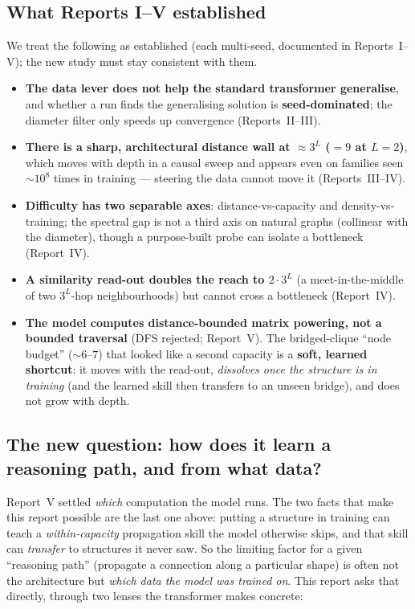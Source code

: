 \documentclass[11pt,a4paper]{article}
\begin{document}
\subsection{What Reports I--V established}
\label{sec:recap}

We treat the following as established (each multi-seed, documented in Reports~I--V); the new study
must stay consistent with them.

\begin{itemize}\setlength\itemsep{0.2em}
  \item \textbf{The data lever does not help the standard transformer generalise}, and whether a
        run finds the generalising solution is \textbf{seed-dominated}; the diameter filter only
        speeds up convergence (Reports~II--III).
  \item \textbf{There is a sharp, architectural distance wall at $\approx 3^L$ ($=9$ at $L=2$)},
        which moves with depth in a causal sweep and appears even on families seen $\sim 10^8$
        times in training --- steering the data cannot move it (Reports~III--IV).
  \item \textbf{Difficulty has two separable axes}: distance-vs-capacity and
        density-vs-training; the spectral gap is not a third axis on natural graphs (collinear with
        the diameter), though a purpose-built probe can isolate a bottleneck (Report~IV).
  \item \textbf{A similarity read-out doubles the reach to $2\cdot 3^L$} (a meet-in-the-middle of
        two $3^L$-hop neighbourhoods) but cannot cross a bottleneck (Report~IV).
  \item \textbf{The model computes distance-bounded matrix powering, not a bounded traversal}
        (DFS rejected; Report~V). The bridged-clique ``node budget'' ($\sim6$--$7$) that looked
        like a second capacity is a \textbf{soft, learned shortcut}: it moves with the read-out,
        \emph{dissolves once the structure is in training} (and the learned skill then transfers to
        an unseen bridge), and does not grow with depth.
\end{itemize}

\subsection{The new question: how does it learn a reasoning path, and from what data?}
\label{sec:question}

Report~V settled \emph{which} computation the model runs. The two facts that make this report
possible are the last one above: putting a structure in training can teach a \emph{within-capacity}
propagation skill the model otherwise skips, and that skill can \emph{transfer} to structures it
never saw. So the limiting factor for a given ``reasoning path'' (propagate a connection along a
particular shape) is often not the architecture but \emph{which data the model was trained on}.
This report asks that directly, through two lenses the transformer makes concrete:
\end{document}
